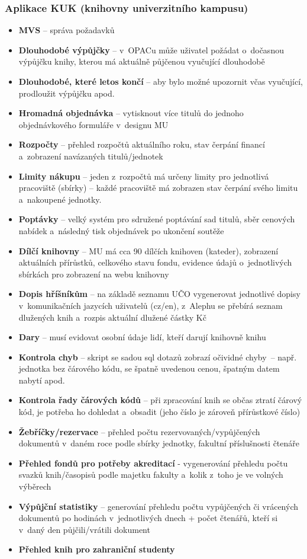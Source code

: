 \documentclass[
	11pt, oneside, printed, final, palatino
	microtype,
	table,   %
	lof,     %
	lot     %
]{fithesis3}
\newcommand{\bold}[1]{\textbf{#1}}
\begin{document}
{\subsubsection{{\large Aplikace KUK (knihovny univerzitního kampusu)}}
\begin{itemize}
\item \bold{MVS} – správa požadavků
\item \bold{Dlouhodobé výpůjčky} – v~OPACu může uživatel požádat o~dočasnou výpůjčku knihy, kterou má aktuálně půjčenou vyučující dlouhodobě
\item \bold{Dlouhodobé, které letos končí} – aby bylo možné upozornit včas vyučující, prodloužit výpůjčku apod.
\item \bold{Hromadná objednávka} – vytisknout více titulů do jednoho objednávkového formuláře v~designu MU
\item \bold{Rozpočty} – přehled rozpočtů aktuálního roku, stav čerpání financí a~zobrazení navázaných titulů/jednotek
\item \bold{Limity nákupu} – jeden z~rozpočtů má určeny limity pro jednotlivá pracoviště (sbírky) – každé pracoviště má zobrazen stav čerpání svého limitu a~nakoupené jednotky.
\item \bold{Poptávky} – velký systém pro sdružené poptávání sad titulů, sběr cenových nabídek a~následný tisk objednávek po ukončení soutěže
\item \bold{Dílčí knihovny} – MU má cca 90 dílčích knihoven (kateder), zobrazení aktuálních přírůstků, celkového stavu fondu, evidence údajů o~jednotlivých sbírkách pro zobrazení na webu knihovny
\item \bold{Dopis hříšníkům} – na základě seznamu UČO vygenerovat jednotlivé dopisy v~komunikačních jazycích uživatelů (cz/en), z~Alephu se přebírá seznam dlužených knih a~rozpis aktuální dlužené částky Kč
\item \bold{Dary} – musí evidovat osobní údaje lidí, kteří darují knihovně knihu
\item \bold{Kontrola chyb} – skript se sadou sql dotazů zobrazí očividné chyby~– např. jednotka bez čárového kódu, se špatně uvedenou cenou, špatným datem nabytí apod.
\item \bold{Kontrola řady čárových kódů} – při zpracování knih se občas ztratí čárový kód, je potřeba ho dohledat a~obsadit (jeho číslo je zároveň přírůstkové číslo)
\item \bold{Žebříčky/rezervace} – přehled počtu rezervovaných/vypůjčených dokumentů v~daném roce podle sbírky jednotky, fakultní příslušnosti čtenáře
\item \bold{Přehled fondů pro potřeby akreditací} - vygenerování přehledu počtu svazků knih/časopisů podle majetku fakulty a~kolik z~toho je ve volných výběrech
\item \bold{Výpůjční statistiky} – generování přehledu počtu vypůjčených či vrácených dokumentů po hodinách v~jednotlivých dnech + počet čtenářů, kteří si v~daný den půjčili/vrátili dokument
\item \bold{Přehled knih pro zahraniční studenty}
\end{itemize}

}
\end{document}
